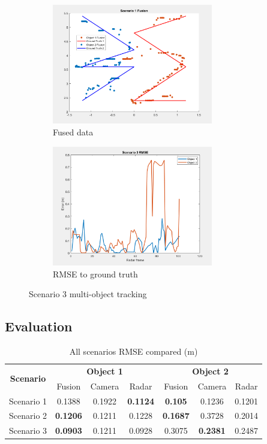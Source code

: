 \begin{figure}[!htb]
    \begin{subfigure}[b]{0.475\textwidth}%
        \includegraphics[width=7cm]{Figures/fusion_scene3.png}
        \caption{Fused data}
        \label{subfig:with_fusion_3}
    \end{subfigure}
    \begin{subfigure}[b]{0.475\textwidth}%
        \includegraphics[width=7cm]{Figures/RMSE3.png}
        \caption{RMSE to ground truth}
        \label{subfig:RMSE_3}
    \end{subfigure}
    \caption{Scenario 3 multi-object tracking}
    \label{fig:scenario_result_3}
\end{figure}
\newpage
\subsection{Evaluation}\label{sec:3-evaluation}
\begin{table}[h!]
    \begin{center}
      \label{tab:table2}
      \begin{tabular}{c|c|c|c|c|c|c} %
        \multirow{2}{*}{\textbf{Scenario}} & \multicolumn{3}{c|}{\textbf{Object 1}}  & \multicolumn{3}{c|}{\textbf{Object 2}}\\
        \cline{2-7}
                   & Fusion & Camera & Radar & Fusion & Camera & Radar \\
        \hline
        Scenario 1 & 0.1388 & 0.1922 & \textbf{0.1124} & \textbf{0.105}  & 0.1236 & 0.1201 \\
        Scenario 2 & \textbf{0.1206} & 0.1211 & 0.1228 & \textbf{0.1687} & 0.3728 & 0.2014 \\
        Scenario 3 & \textbf{0.0903} & 0.1211 & 0.0928 & 0.3075 & \textbf{0.2381} & 0.2487 \\
      \end{tabular}
    \end{center}
    \caption{All scenarios RMSE compared (m)}
    \label{tab:scenarios_rmse}
  \end{table}

